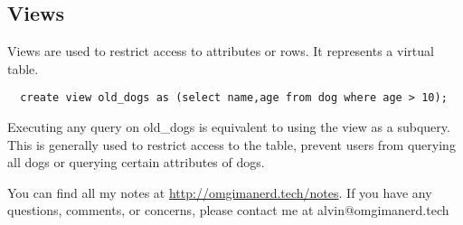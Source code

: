 \documentclass{math}
\begin{document}
\subsection*{Views}
Views are used to restrict access to attributes or rows. It represents a virtual
table.
\begin{lstlisting}
  create view old_dogs as (select name,age from dog where age > 10);
\end{lstlisting}
Executing any query on old\_dogs is equivalent to using the view as a subquery.
This is generally used to restrict access to the table, prevent users from
querying all dogs or querying certain attributes of dogs.

\begin{center}
  You can find all my notes at \url{http://omgimanerd.tech/notes}. If you have
  any questions, comments, or concerns, please contact me at
  alvin@omgimanerd.tech
\end{center}
\end{document}
